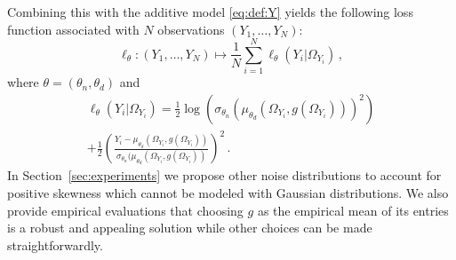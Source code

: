 \documentclass{article}
\begin{document}
Combining this with the additive model  \eqref{eq:def:Y} yields the following loss function associated with $N$ observations $(Y_1,\ldots,Y_N)$:
$$
\ell_{\theta}: (Y_1,\ldots,Y_N) \mapsto \frac{1}{N}\sum_{i=1}^N \ell_{\theta}(Y_i|\Omega_{Y_i})\,,
$$
where $\theta = (\theta_n,\theta_d)$ and
\begin{multline*}
\ell_{\theta}(Y_i|\Omega_{Y_i}) = \frac{1}{2}\log(\sigma_{\theta_n}( \mu_{\theta_d}(\Omega_{Y_i},g(\Omega_{Y_i})))^2) \\
+\frac{1}{2}\left(\frac{Y_i-\mu_{\theta_d}(\Omega_{Y_i},g(\Omega_{Y_i}))}{\sigma_{\theta_n}(\mu_{\theta_d}(\Omega_{Y_i},g(\Omega_{Y_i}))}\right)^2\,. %
\end{multline*}
In Section~\ref{sec:experiments} we propose other noise distributions to account for positive skewness which cannot be modeled with Gaussian distributions. We also provide empirical evaluations that choosing $g$ as the empirical mean of its entries is a robust and appealing solution while other choices can be made straightforwardly.




\end{document}
